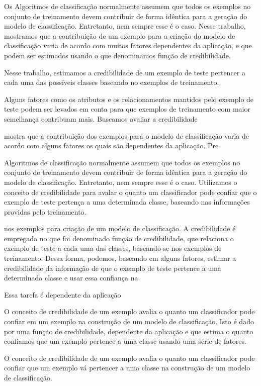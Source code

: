 Os Algoritmos de classificação normalmente assumem que todos os exemplos no conjunto de treinamento devem contribuir de forma idêntica para a geração do modelo de classificação. 
Entretanto, nem sempre esse é o caso.
Nesse trabalho, mostramos que a contribuição de um exemplo para a criação do modelo de classificação varia de acordo com muitos fatores dependentes da aplicação, e que podem ser estimados usando o que denominamos função de credibilidade.


Nesse trabalho, estimamos a credibilidade de um exemplo de teste pertencer a cada uma das possíveis classes baseando no exemplos de treinamento.


Alguns fatores como os atributos e os relacionamentos mantidos pelo exemplo de teste podem ser levados em conta para que exemplos de treinamento com maior semelhança contribuam mais.
Buscamos avaliar a credibilidade 


mostra que a contribuição dos exemplos para o modelo de classificação varia de acordo com alguns fatores os quais são dependentes da aplicação.
Pre



Algoritmos de classificação normalmente assumem que todos os exemplos no conjunto de treinamento devem contribuir de forma idêntica para a geração do modelo de classificação. 
Entretanto, nem sempre esse é o caso.
Utilizamos o conceito de credibilidade para avalar o quanto um classificador pode confiar que o exemplo de teste pertença a uma determinada classe, baseando nas informações providas pelo treinamento.

nos exemplos para criação de um modelo de classificação.
A credibilidade é empregada no que foi denominado função de credibilidade, que relaciona o exemplo de teste a cada uma das classes, baseando-se nos exemplos de treinamento.
Dessa forma, podemos, baseando em alguns fatores, estimar a credibilidade da informação de que o exemplo de teste pertence a uma determinada classe e usar essa confiança na 


Essa tarefa é dependente da aplicação 



O conceito de credibilidade de um exemplo avalia o quanto um classificador pode confiar em um exemplo na construção de um modelo de classificação.
Isto é dado por uma função de credibilidade, dependente da aplicação e que estima o quanto confiamos que um exemplo pertence a uma classe usando uma série de fatores.


O conceito de credibilidade de um exemplo avalia o quanto um classificador pode confiar que um exemplo vá pertencer a uma classe na construção de um modelo de classificação.




